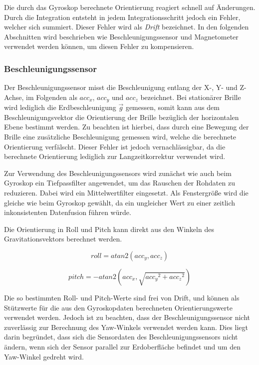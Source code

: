 Die durch das Gyroskop berechnete Orientierung reagiert schnell auf
Änderungen. Durch die Integration entsteht in jedem Integrationsschritt jedoch ein Fehler, welcher sich summiert. Dieser Fehler wird als \emph{Drift} bezeichnet. In den folgenden Abschnitten wird beschrieben wie Beschleunigungssensor und Magnetometer verwendet werden können, um diesen Fehler zu kompensieren.



\subsubsection{Beschleunigungssensor}


Der Beschleunigungssensor misst die Beschleunigung entlang der X-, Y-
und Z-Achse, im Folgenden als $acc_x$, $acc_y$ und $acc_z$ bezeichnet.
Bei stationärer Brille wird lediglich die Erdbeschleunigung $\vec g$
gemessen, somit kann aus dem Beschleunigungsvektor die Orientierung der
Brille bezüglich der horizontalen Ebene bestimmt werden. Zu beachten
ist hierbei, dass durch eine Bewegung der Brille eine zusätzliche
Beschleunigung gemessen wird, welche die berechnete Orientierung
verfälscht. Dieser Fehler ist jedoch vernachlässigbar, da die berechnete
Orientierung lediglich zur Langzeitkorrektur verwendet wird.


Zur Verwendung des Beschleunigungssensors wird zunächst wie auch beim
Gyroskop ein Tiefpassfilter angewendet, um das Rauschen der Rohdaten zu
reduzieren.
Dabei wird ein Mittelwertfilter eingesetzt.
Als Fenstergröße wird die gleiche wie beim Gyroskop gewählt, da ein ungleicher Wert zu einer zeitlich inkonsistenten Datenfusion führen würde.


Die Orientierung in Roll und Pitch kann direkt aus den Winkeln des Gravitationsvektors berechnet werden.

\begin{equation}
    roll = atan2(acc_y, acc_z)
\end{equation}

\begin{equation}
    pitch = -atan2(acc_x, \sqrt{ {acc_y}^2 + {acc_z}^2 })
\end{equation}

Die so bestimmten Roll- und Pitch-Werte sind frei von Drift, und können als Stützwerte für die aus den Gyroskopdaten berechneten Orientierungswerte verwendet werden.
Jedoch ist zu beachten, dass der Beschleunigungssensor nicht zuverlässig zur Berechnung des Yaw-Winkels verwendet werden kann.
Dies liegt darin begründet, dass sich die Sensordaten des Beschleunigungssensors nicht ändern, wenn sich der Sensor parallel zur Erdoberfläche befindet und um den Yaw-Winkel gedreht wird.


